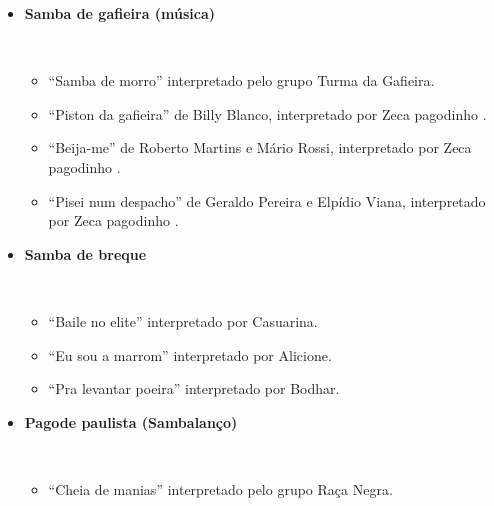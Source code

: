 \begin{itemize}
\item \textbf{Samba de gafieira (música)}
\begin{example} ~
\begin{itemize}
\item ``Samba de morro'' interpretado pelo grupo Turma da Gafieira.
\item ``Piston da gafieira'' de Billy Blanco, interpretado por Zeca pagodinho \cite{barbosa2014zeca}.
\item ``Beija-me'' de Roberto Martins e Mário Rossi, interpretado por Zeca pagodinho \cite{barbosa2014zeca}.
\item ``Pisei num despacho'' de Geraldo Pereira e Elpídio Viana, interpretado por Zeca pagodinho \cite{barbosa2014zeca}.
\end{itemize}
\end{example} 

\item \textbf{Samba de breque}
\begin{example} ~
\begin{itemize}
\item ``Baile no elite'' interpretado por Casuarina.
\item ``Eu sou a marrom'' interpretado por Alicione.
\item ``Pra levantar poeira'' interpretado por Bodhar.
\end{itemize}
\end{example} 

\item \textbf{Pagode paulista (Sambalanço)}
\begin{example} ~
\begin{itemize}
\item ``Cheia de manias''  interpretado pelo grupo Raça Negra.
\end{itemize}
\end{example} 


\end{itemize}
